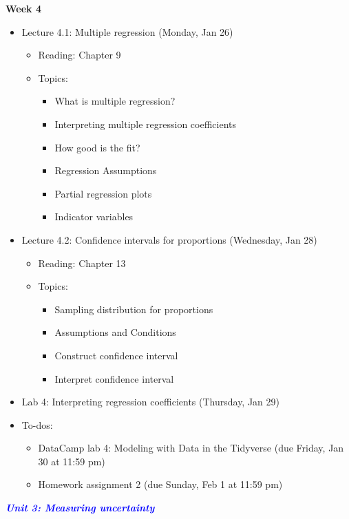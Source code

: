\documentclass[11pt]{article}
\begin{document}
\textbf{Week 4}
\begin{itemize}
    \item Lecture 4.1: Multiple regression (Monday, Jan 26)
    \begin{itemize}
        \item Reading: Chapter 9
        \item Topics: 
        \begin{itemize}
            \item What is multiple regression?
            \item Interpreting multiple regression coefficients
            \item How good is the fit?
            \item Regression Assumptions
            \item Partial regression plots
            \item Indicator variables
        \end{itemize}
    \end{itemize}
    \item Lecture 4.2: Confidence intervals for proportions (Wednesday, Jan 28)
    \begin{itemize}
        \item Reading: Chapter 13
        \item Topics:
        \begin{itemize}
            \item Sampling distribution for proportions
            \item Assumptions and Conditions
            \item Construct confidence interval
            \item Interpret confidence interval
        \end{itemize}
    \end{itemize}
    \item Lab 4: Interpreting regression coefficients (Thursday, Jan 29)
    \item To-dos:
    \begin{itemize}
        \item DataCamp lab 4: Modeling with Data in the Tidyverse (due Friday, Jan 30 at 11:59 pm)
        \item Homework assignment 2 (due Sunday, Feb 1 at 11:59 pm)
    \end{itemize}
\end{itemize}




\Large \textcolor{blue}{\textit{\textbf{Unit 3: Measuring uncertainty}}} \\
\end{document}
